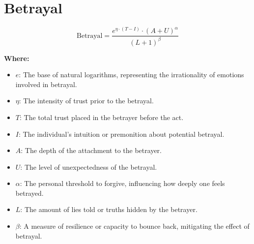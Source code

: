 \chapter{Betrayal}

\begin{equation}
\text{Betrayal} = \frac{e^{\eta \cdot (T - I)} \cdot (A + U)^\alpha}{(L + 1)^\beta}
\end{equation}

\textbf{Where:}

\begin{itemize}
    \item $e$: The base of natural logarithms, representing the irrationality of emotions involved in betrayal.
    \item $\eta$: The intensity of trust prior to the betrayal.
    \item $T$: The total trust placed in the betrayer before the act.
    \item $I$: The individual's intuition or premonition about potential betrayal.
    \item $A$: The depth of the attachment to the betrayer.
    \item $U$: The level of unexpectedness of the betrayal.
    \item $\alpha$: The personal threshold to forgive, influencing how deeply one feels betrayed.
    \item $L$: The amount of lies told or truths hidden by the betrayer.
    \item $\beta$: A measure of resilience or capacity to bounce back, mitigating the effect of betrayal.
\end{itemize}